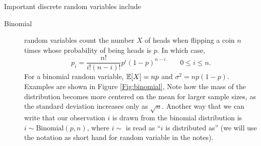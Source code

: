 Important discrete random variables include
\begin{description}
\item[Binomial]  random variables count the number $X$ of heads when
  flipping a coin $n$ times whose probability of being heads is $p$. In which case, 
\begin{equation}
  p_i = \frac{n!}{i!(n-i)!} p^i (1-p)^{n-i} \qquad 0\le i \le n.
\end{equation}
For a binomial random variable, $\mathbb{E}[X]=np$ and
$\sigma^2=np(1-p)$. Examples are shown in Figure \ref{Fig:binomial}, Note how the mass of the
   distribution becomes more centered on the mean for larger sample
   sizes, as the standard deviation increases only as $\sqrt{n}$. 
Another way that we can write that our observation $i$ is drawn from
the binomial distribution is $i \sim
\textrm{Binomial}(p,n)$, where $i \sim$ is read as ``$i$ is
distributed as'' (we will use the notation as short hand for random
variable in the notes).


\end{description}
